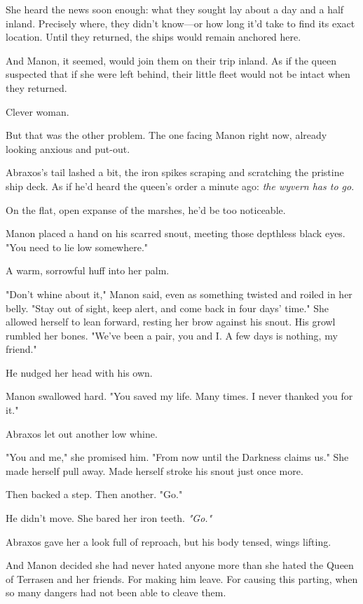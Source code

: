 She heard the news soon enough: what they sought lay about a day and a half inland. Precisely where, they didn't know---or how long it'd take to find its exact location. Until they returned, the ships would remain anchored here.

And Manon, it seemed, would join them on their trip inland. As if the queen suspected that if she were left behind, their little fleet would not be intact when they returned.

Clever woman.

But that was the other problem. The one facing Manon right now, already looking anxious and put-out.

Abraxos's tail lashed a bit, the iron spikes scraping and scratching the pristine ship deck. As if he'd heard the queen's order a minute ago:
\emph{the wyvern has to go}.

On the flat, open expanse of the marshes, he'd be too noticeable.

Manon placed a hand on his scarred snout, meeting those depthless black eyes. "You need to lie low somewhere."

A warm, sorrowful huff into her palm.

"Don't whine about it," Manon said, even as something twisted and roiled in her belly. "Stay out of sight, keep alert, and come back in four days' time." She allowed herself to lean forward, resting her brow against his snout. His growl rumbled her bones. "We've been a pair, you and I. A few days is nothing, my friend."

He nudged her head with his own.

Manon swallowed hard. "You saved my life. Many times. I never thanked you for it."

Abraxos let out another low whine.

"You and me," she promised him. "From now until the Darkness claims us." She made herself pull away. Made herself stroke his snout just once more.

Then backed a step. Then another. "Go."

He didn't move. She bared her iron teeth. \emph{"Go."}

Abraxos gave her a look full of reproach, but his body tensed, wings lifting.

And Manon decided she had never hated anyone more than she hated the Queen of Terrasen and her friends. For making him leave. For causing this parting, when so many dangers had not been able to cleave them.

